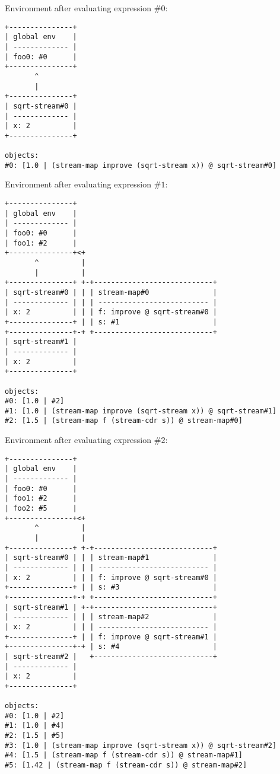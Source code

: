 \documentclass[../main.tex]{subfiles}
\begin{document}
Environment after evaluating expression $\#0$:

\begin{lstlisting}
+---------------+
| global env    |
| ------------- |
| foo0: #0      |
+---------------+
       ^
       |
+---------------+
| sqrt-stream#0 |
| ------------- |
| x: 2          |
+---------------+

objects:
#0: [1.0 | (stream-map improve (sqrt-stream x)) @ sqrt-stream#0]
\end{lstlisting}

Environment after evaluating expression $\#1$:

\begin{lstlisting}
+---------------+
| global env    |
| ------------- |
| foo0: #0      |
| foo1: #2      |
+---------------+<+
       ^          |
       |          |
+---------------+ +-+----------------------------+
| sqrt-stream#0 | | | stream-map#0               |
| ------------- | | | -------------------------- |
| x: 2          | | | f: improve @ sqrt-stream#0 |
+---------------+ | | s: #1                      |
+---------------+-+ +----------------------------+
| sqrt-stream#1 |
| ------------- |
| x: 2          |
+---------------+

objects:
#0: [1.0 | #2]
#1: [1.0 | (stream-map improve (sqrt-stream x)) @ sqrt-stream#1]
#2: [1.5 | (stream-map f (stream-cdr s)) @ stream-map#0]
\end{lstlisting}

Environment after evaluating expression $\#2$:

\begin{lstlisting}
+---------------+
| global env    |
| ------------- |
| foo0: #0      |
| foo1: #2      |
| foo2: #5      |
+---------------+<+
       ^          |
       |          |
+---------------+ +-+----------------------------+
| sqrt-stream#0 | | | stream-map#1               |
| ------------- | | | -------------------------- |
| x: 2          | | | f: improve @ sqrt-stream#0 |
+---------------+ | | s: #3                      |
+---------------+-+ +----------------------------+
| sqrt-stream#1 | +-+----------------------------+
| ------------- | | | stream-map#2               |
| x: 2          | | | -------------------------- |
+---------------+ | | f: improve @ sqrt-stream#1 |
+---------------+-+ | s: #4                      |
| sqrt-stream#2 |   +----------------------------+
| ------------- |
| x: 2          |
+---------------+

objects:
#0: [1.0 | #2]
#1: [1.0 | #4]
#2: [1.5 | #5]
#3: [1.0 | (stream-map improve (sqrt-stream x)) @ sqrt-stream#2]
#4: [1.5 | (stream-map f (stream-cdr s)) @ stream-map#1]
#5: [1.42 | (stream-map f (stream-cdr s)) @ stream-map#2]
\end{lstlisting}
\end{document}
